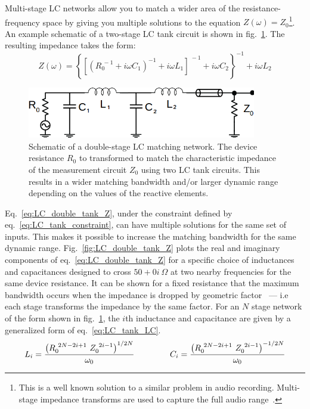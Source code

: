 Multi-stage LC networks allow you to match a wider area of the resistance-frequency space by giving you multiple solutions to the equation $Z(\omega)=Z_0$\footnote{This is a well known solution to a similar problem in audio recording. Multi-stage impedance transforms are used to capture the full audio range~\cite{?}.}. An example schematic of a two-stage LC tank circuit is shown in fig.~\ref{fig:schematic_double_matching}. The resulting impedance takes the form:
\begin{equation}\label{eq:LC_double_tank_Z}
Z(\omega) = \left\lbrace\left[\left(R_0^{~-1}+i\omega C_1\right)^{-1}+i\omega L_1\right]^{~-1}+i\omega C_2\right\rbrace^{-1}+i\omega L_2
\end{equation}
\begin{figure}
\centering
\includegraphics[width=100mm]{figures/Johnson_noise_thermometry/schematic_double_matching}
\caption{Schematic of a double-stage LC matching network. The device resistance $R_0$ to transformed to match the characteristic impedance of the measurement circuit $Z_0$ using two LC tank circuits. This results in a wider matching bandwidth and/or larger dynamic range depending on the values of the reactive elements.}
\label{fig:schematic_double_matching}
\end{figure}
Eq.~\ref{eq:LC_double_tank_Z}, under the constraint defined by eq.~\ref{eq:LC_tank_constraint}, can have multiple solutions for the same set of inputs. This makes it possible to increase the matching bandwidth for the same dynamic range. Fig.~\ref{fig:LC_double_tank_Z} plots the real and imaginary components of eq.~\ref{eq:LC_double_tank_Z} for a specific choice of inductances and capacitances designed to cross $50+0i~\Omega$ at two nearby frequencies for the same device resistance. It can be shown for a fixed resistance that the maximum bandwidth occurs when the impedance is dropped by geometric factor~\cite{pozar_microwave_2011} --- i.e each stage transforms the impedance by the same factor. For an $N$ stage network of the form shown in fig.~\ref{fig:schematic_double_matching}, the $i$th inductance and capacitance are given by a generalized form of eq.~\ref{eq:LC_tank_LC}. 
\begin{equation}\label{eq:LC_double_tank_LC}
L_i = \frac{\left(R_0^{~2N-2i+1}~Z_0^{~2i-1}\right)^{1/2N}}{\omega_0}
\hspace{15mm}
C_i = \frac{\left(R_0^{~2N-2i+1}~Z_0^{~2i-1}\right)^{-1/2N}}{\omega_0}
\end{equation}
